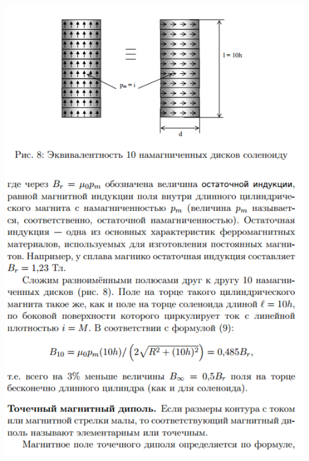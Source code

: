 \documentclass[12pt]{article}
\begin{document}
\begin{center}
	    \includegraphics[width=15cm]{theory10.png}

\end{center}
\end{document}
